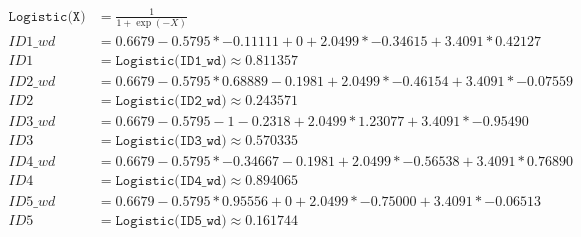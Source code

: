 \documentclass[10pt,a4paper]{article}
\begin{document}
		\begin{equation*}
			\begin{split}
				\texttt{Logistic(X)} & = \frac{1}{1 + \exp{(-X)}} \\
				ID1\_wd & = 0.6679 - 0.5795 * -0.11111 + 0 + 2.0499 * -0.34615 + 3.4091 * 0.42127 \\
				ID1 & = \texttt{Logistic(ID1\_wd)} \approx 0.811357 \\
				ID2\_wd & = 0.6679 - 0.5795 * 0.68889 - 0.1981 + 2.0499 * -0.46154 + 3.4091 * -0.07559 \\
				ID2 & = \texttt{Logistic(ID2\_wd)} \approx 0.243571 \\
				ID3\_wd & = 0.6679 - 0.5795 - 1 - 0.2318 + 2.0499 * 1.23077 + 3.4091 * -0.95490 \\
				ID3 & = \texttt{Logistic(ID3\_wd)} \approx 0.570335 \\
				ID4\_wd & = 0.6679 - 0.5795 * -0.34667 - 0.1981 + 2.0499 * -0.56538 + 3.4091 * 0.76890 \\
				ID4 & = \texttt{Logistic(ID4\_wd)} \approx 0.894065 \\
				ID5\_wd & = 0.6679 - 0.5795 * 0.95556 + 0 + 2.0499 * -0.75000 + 3.4091 * -0.06513 \\
				ID5 & = \texttt{Logistic(ID5\_wd)} \approx 0.161744
			\end{split}
		\end{equation*}
	
	\newpage
	
\end{document}
